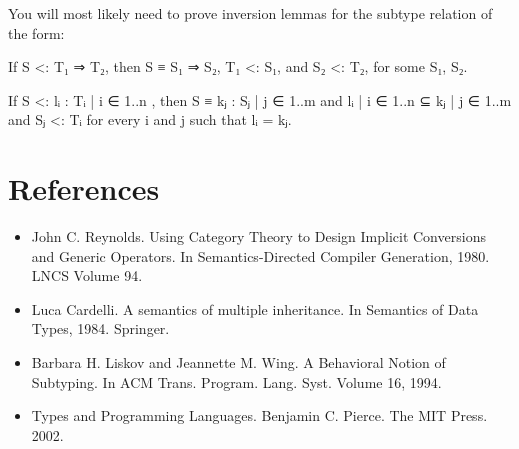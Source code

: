 You will most likely need to prove inversion lemmas for the subtype
relation of the form:

\begin{myDisplay}
If S <: T₁ ⇒ T₂, then S ≡ S₁ ⇒ S₂, T₁ <: S₁, and S₂ <: T₂, for some S₁, S₂.

If S <: { lᵢ : Tᵢ | i ∈ 1..n }, then S ≡ { kⱼ : Sⱼ | j ∈ 1..m }
and { lᵢ | i ∈ 1..n } ⊆ { kⱼ | j ∈ 1..m }
and Sⱼ <: Tᵢ for every i and j such that lᵢ = kⱼ.
\end{myDisplay}

\hypertarget{references}{%
\section{References}\label{references}}

\begin{itemize}
\item
  John C. Reynolds. Using Category Theory to Design Implicit Conversions
  and Generic Operators. In Semantics-Directed Compiler Generation,
  1980. LNCS Volume 94.
\item
  Luca Cardelli. A semantics of multiple inheritance. In Semantics of
  Data Types, 1984. Springer.
\item
  Barbara H. Liskov and Jeannette M. Wing. A Behavioral Notion of
  Subtyping. In ACM Trans. Program. Lang. Syst. Volume 16, 1994.
\item
  Types and Programming Languages. Benjamin C. Pierce. The MIT Press.
  2002.
\end{itemize}

